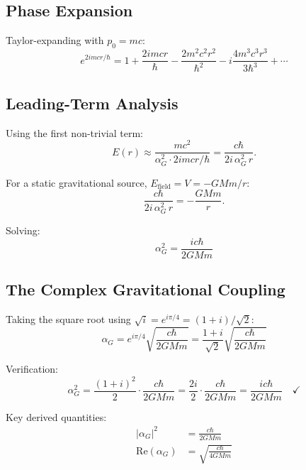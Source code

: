 \documentclass[11pt,a4paper]{article}
\theoremstyle{definition}
\theoremstyle{remark}
\begin{document}
	\subsection{Phase Expansion}
	
	Taylor-expanding with $p_0=mc$:
	\begin{equation}
		e^{2imcr/\hbar} = 1 + \frac{2imcr}{\hbar} - \frac{2m^2c^2r^2}{\hbar^2} - i\frac{4m^3c^3r^3}{3\hbar^3} + \cdots
	\end{equation}
	
	\subsection{Leading-Term Analysis}
	
	Using the first non-trivial term:
	\begin{equation}
		E(r) \approx \frac{mc^2}{\alpha_G^2\cdot 2imcr/\hbar} = \frac{c\hbar}{2i\,\alpha_G^2\,r}.
	\end{equation}
	
	For a static gravitational source, $E_{\mathrm{field}} = V = -GMm/r$:
	\begin{equation}
		\frac{c\hbar}{2i\,\alpha_G^2\,r} = -\frac{GMm}{r}.
	\end{equation}
	
	Solving:
	\begin{equation}
		\boxed{\alpha_G^2 = \frac{ic\hbar}{2GMm}}
		\label{eq:alphaG2}
	\end{equation}
	
	\subsection{The Complex Gravitational Coupling}
	
	Taking the square root using $\sqrt{i}=e^{i\pi/4}=(1+i)/\sqrt{2}$:
	\begin{equation}
		\boxed{\alpha_G = e^{i\pi/4}\sqrt{\frac{c\hbar}{2GMm}} = \frac{1+i}{\sqrt{2}}\sqrt{\frac{c\hbar}{2GMm}}}
		\label{eq:alphaG_full}
	\end{equation}
	
	Verification:
	\begin{equation}
		\alpha_G^2 = \frac{(1+i)^2}{2}\cdot\frac{c\hbar}{2GMm} = \frac{2i}{2}\cdot\frac{c\hbar}{2GMm} = \frac{ic\hbar}{2GMm} \quad\checkmark
	\end{equation}
	
	Key derived quantities:
	\begin{align}
		|\alpha_G|^2       &= \frac{c\hbar}{2GMm}                             \label{eq:mod_alphaG} \\
		\mathrm{Re}(\alpha_G) &= \sqrt{\frac{c\hbar}{4GMm}}                  \label{eq:re_alphaG}
	\end{align}
	
\end{document}
